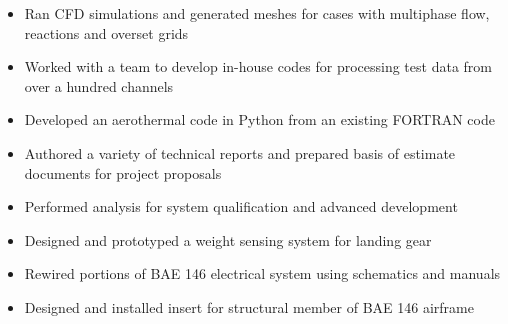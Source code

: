 \documentclass[10pt,ragged2e]{altacv}
\begin{document}
\addvspace{.14cm}

\divider

\addvspace{.14cm}

\begin{itemize}
  \item Ran CFD simulations and generated meshes for cases with multiphase flow, reactions and overset grids
  \item Worked with a team to develop in-house codes for processing test data from over a hundred channels
  \item Developed an aerothermal code in Python from an existing FORTRAN code
  \item Authored a variety of technical reports and prepared basis of estimate documents for project proposals
  \item Performed analysis for system qualification and advanced development
\end{itemize}

\addvspace{.14cm}

\divider

\addvspace{.14cm}

\begin{itemize}
  \item Designed and prototyped a weight sensing system for landing gear
  \item Rewired portions of BAE 146 electrical system using schematics and manuals
  \item Designed and installed insert for structural member of BAE 146 airframe

\end{itemize}



\clearpage

\nocite{*}
\end{document}
